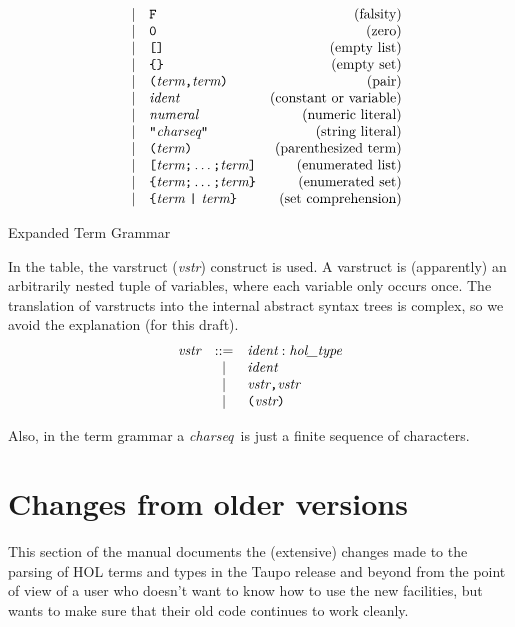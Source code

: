 \documentclass[12pt,fleqn,a4paper]{report}
\newcommand{\ident}      {\mbox{\it ident}}
\newcommand{\numeral}    {\mbox{\it numeral}}
\newcommand{\charseq}    {\mbox{\it charseq}}
\newcommand{\vstr}       {\mbox{\it vstr}}
\newcommand{\type}       {\mbox{\it hol\_type}}
\newcommand{\term}       {\mbox{\it term}}
\begin{document}
\begin{table}
\[\begin{array}{rclr}
  & | & \verb+F+ & \mbox{(falsity)} \\
  & | & \verb+0+ & \mbox{(zero)} \\
  & | & \verb+[]+ & \mbox{(empty list)} \\
  & | & \verb+{}+ & \mbox{(empty set)} \\
  & | & \verb+(+ \term \verb+,+ \term \verb+)+ & \mbox{(pair)} \\
  & | & \ident & \mbox{(constant or variable)} \\
  & | & \numeral & \mbox{(numeric literal)} \\
  & | & \verb+"+\charseq \verb+"+& \mbox{(string literal)} \\
  & | & \verb+(+ \term \verb+)+ & \mbox{(parenthesized term)} \\
  & | & \verb+[+ \term \verb+;+ \ldots \verb+;+ \term \verb+]+ &
 \mbox{(enumerated list)} \\
  & | & \verb+{+ \term \verb+;+ \ldots \verb+;+ \term \verb+}+ &
 \mbox{(enumerated set)} \\
  & | & \verb+{+ \term \ \verb+|+\  \term \verb+}+ & \mbox{(set comprehension)}
 \end{array}
 \]
 \caption{Expanded Term Grammar} \label{expanded-grammar}
 \end{table}

 In the table, the varstruct ({\it vstr\/}) construct is used. A
 varstruct is (apparently) an arbitrarily nested tuple of variables, where
 each variable only occurs once. The translation of varstructs into the
 internal abstract syntax trees is complex, so we avoid
 the explanation (for this draft).
 \[
 \begin{array}{rcl}
  \vstr & ::= & \ident : \type \\
  & | & \ident  \\
  & | & \vstr \verb+,+ \vstr \\
  & | & \verb+(+ \vstr \verb+)+
 \end{array}
 \]

\noindent Also, in the term grammar a \charseq\ is just a finite sequence of
 characters.


\section{Changes from older versions}

This section of the manual documents the (extensive) changes made to
the parsing of HOL terms and types in the Taupo release and beyond
from the point of view of a user who doesn't want to know how to use
the new facilities, but wants to make sure that their old code
continues to work cleanly.
\end{document}
